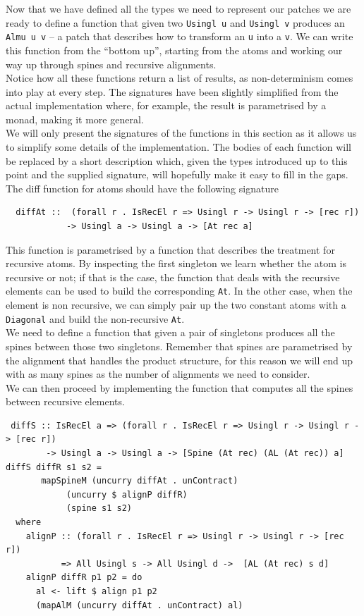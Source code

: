 \documentclass[11pt, titlepage]{article}
\newcommand{\toHaskell}[1]{\texttt{#1}\xspace}
\begin{document}
Now that we have defined all the types we need to represent our patches we are ready to define a function that given two \toHaskell{Usingl u} and \toHaskell{Usingl v} produces an \toHaskell{Almu u v} -- a patch that describes how to transform an \toHaskell{u} into a \toHaskell{v}.
We can write this function from the ``bottom up'', starting from the atoms and working our way up through spines and recursive alignments. 
\\
Notice how all these functions return a list of results, as non-determinism comes into play at every step. The signatures have been slightly simplified from the actual implementation where, for example, the result is parametrised by a monad, making it more general.
\\
We will only present the signatures of the functions in this section as it allows us to simplify some details of the implementation. The bodies of each function will be replaced by a short description which, given the types introduced up to this point and the supplied signature, will hopefully make it easy to fill in the gaps. 
The diff function for atoms should have the following signature
\begin{verbatim}
  diffAt ::  (forall r . IsRecEl r => Usingl r -> Usingl r -> [rec r])
            -> Usingl a -> Usingl a -> [At rec a]
\end{verbatim}
This function is parametrised by a function that describes the treatment for 
recursive atoms. By inspecting the first singleton we learn whether the atom is 
recursive or not; if that is the case, the function that deals with the 
recursive elements can be used to build the corresponding \texttt{At}. In the 
other case, when the element is non recursive, we can simply pair up the two 
constant atoms with a \texttt{Diagonal} and build the non-recursive \texttt{At}.
\\
We need to define a function that given a pair of singletons produces all the spines between those two singletons. Remember that spines are parametrised by the alignment that handles the product structure, for this reason we will end up with as many spines as the number of alignments we need to consider.
\\
We can then proceed by implementing the function that computes all the spines 
between recursive elements.
\begin{verbatim}
 diffS :: IsRecEl a => (forall r . IsRecEl r => Usingl r -> Usingl r -> [rec r])
        -> Usingl a -> Usingl a -> [Spine (At rec) (AL (At rec)) a]
diffS diffR s1 s2 =
       mapSpineM (uncurry diffAt . unContract)
            (uncurry $ alignP diffR) 
            (spine s1 s2)
  where
    alignP :: (forall r . IsRecEl r => Usingl r -> Usingl r -> [rec r])
           => All Usingl s -> All Usingl d ->  [AL (At rec) s d]
    alignP diffR p1 p2 = do
      al <- lift $ align p1 p2
      (mapAlM (uncurry diffAt . unContract) al)
\end{verbatim}
\end{document}
